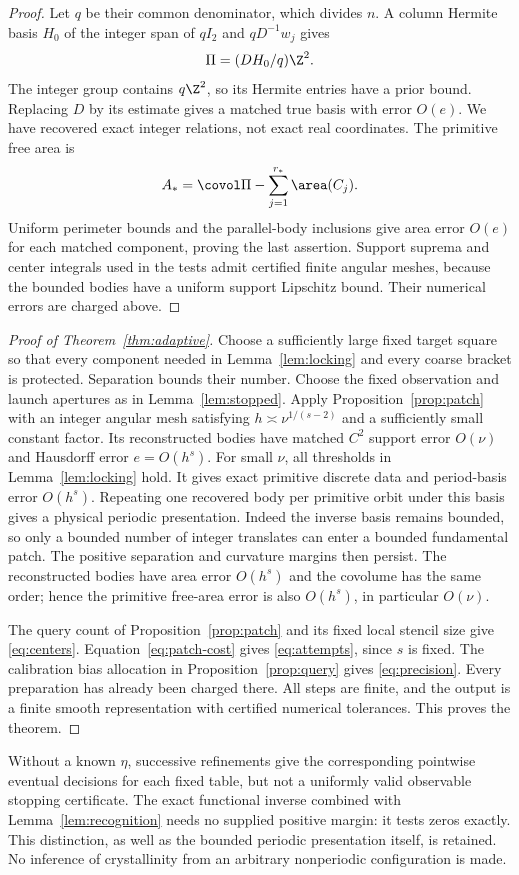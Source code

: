 \begin{proof}
Let $q$ be their common denominator, which divides $n$. A column
Hermite basis $H_0$ of the integer span of $qI_2$ and $qD^{-1}w_j$
gives
\begin{equation}\label{eq:period-basis}
                         \Pi=(DH_0/q)\Z^2.
\end{equation}
The integer group contains $q\Z^2$, so its Hermite entries have a
prior bound. Replacing $D$ by its estimate gives a matched true basis
with error $O(e)$. We have recovered exact integer relations, not
exact real coordinates. The primitive free area is
\[
             A_* =\covol\Pi-\sum_{j=1}^{r_*}\area(C_j).
\]
Uniform perimeter bounds and the parallel-body inclusions give area
error $O(e)$ for each matched component, proving the last assertion.
Support suprema and center integrals used in the tests admit certified
finite angular meshes, because the bounded bodies have a uniform
support Lipschitz bound. Their numerical errors are charged above.
\end{proof}

\begin{proof}[Proof of Theorem~\ref{thm:adaptive}]
Choose a sufficiently large fixed target square so that every component
needed in Lemma~\ref{lem:locking} and every coarse bracket is protected.
Separation bounds their number. Choose the fixed observation and launch
apertures as in Lemma~\ref{lem:stopped}. Apply
Proposition~\ref{prop:patch} with an integer angular mesh satisfying
$h\asymp\nu^{1/(s-2)}$ and a sufficiently small constant factor.
Its reconstructed bodies have matched $C^2$ support error $O(\nu)$
and Hausdorff error $e=O(h^s)$. For small $\nu$, all thresholds in
Lemma~\ref{lem:locking} hold. It gives exact primitive discrete data
and period-basis error $O(h^s)$. Repeating one recovered body per
primitive orbit under this basis gives a physical periodic presentation.
Indeed the inverse basis remains bounded, so only a bounded number of
integer translates can enter a bounded fundamental patch. The positive
separation and curvature margins then persist. The reconstructed
bodies have area error $O(h^s)$ and the covolume has the same order;
hence the primitive free-area error is also $O(h^s)$, in particular
$O(\nu)$.

The query count of Proposition~\ref{prop:patch} and its fixed local
stencil size give \eqref{eq:centers}. Equation~\eqref{eq:patch-cost}
gives \eqref{eq:attempts}, since $s$ is fixed. The calibration bias
allocation in Proposition~\ref{prop:query} gives \eqref{eq:precision}.
Every preparation has already been charged there. All steps are finite,
and the output is a finite smooth representation with certified
numerical tolerances. This proves the theorem.
\end{proof}

Without a known $\eta$, successive refinements give the corresponding
pointwise eventual decisions for each fixed table, but not a uniformly
valid observable stopping certificate. The exact functional inverse
combined with Lemma~\ref{lem:recognition} needs no supplied positive
margin: it tests zeros exactly. This distinction, as well as the
bounded periodic presentation itself, is retained. No inference of
crystallinity from an arbitrary nonperiodic configuration is made.

